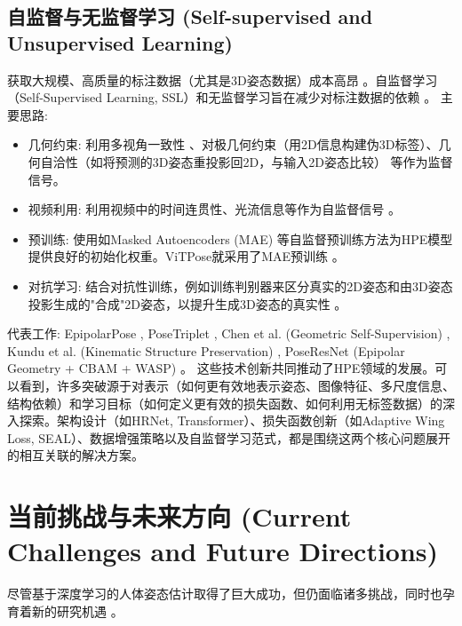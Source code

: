 \documentclass[12pt,a4paper]{article}
\begin{document}
\subsection{自监督与无监督学习 (Self-supervised and Unsupervised Learning)}
获取大规模、高质量的标注数据（尤其是3D姿态数据）成本高昂 \cite{Zhang2018PoseResNet}。自监督学习（Self-Supervised Learning, SSL）和无监督学习旨在减少对标注数据的依赖 \cite{Zhang2018PoseResNet}。
主要思路:
\begin{itemize}
    \item 几何约束: 利用多视角一致性 \cite{Kocabas2019EpipolarPose}、对极几何约束（用2D信息构建伪3D标签）\cite{Zhang2018PoseResNet}、几何自洽性（如将预测的3D姿态重投影回2D，与输入2D姿态比较）\cite{Chen2019Unsupervised3D} 等作为监督信号。 %
    \item 视频利用: 利用视频中的时间连贯性、光流信息等作为自监督信号 \cite{Gong2022PoseTriplet}。 %
    \item 预训练: 使用如Masked Autoencoders (MAE) \cite{He2022MAE} 等自监督预训练方法为HPE模型提供良好的初始化权重。ViTPose就采用了MAE预训练 \cite{He2022MAE}。
    \item 对抗学习: 结合对抗性训练，例如训练判别器来区分真实的2D姿态和由3D姿态投影生成的"合成"2D姿态，以提升生成3D姿态的真实性 \cite{Chen2019Unsupervised3D}。
\end{itemize}
代表工作: EpipolarPose \cite{Kocabas2019EpipolarPose}, PoseTriplet \cite{Gong2022PoseTriplet}, Chen et al. (Geometric Self-Supervision) \cite{Chen2019Unsupervised3D}, Kundu et al. (Kinematic Structure Preservation) \cite{Kundu2020Kinematic}, PoseResNet (Epipolar Geometry + CBAM + WASP) \cite{Zhang2018PoseResNet}。 %
这些技术创新共同推动了HPE领域的发展。可以看到，许多突破源于对表示（如何更有效地表示姿态、图像特征、多尺度信息、结构依赖）和学习目标（如何定义更有效的损失函数、如何利用无标签数据）的深入探索。架构设计（如HRNet, Transformer）、损失函数创新（如Adaptive Wing Loss, SEAL）、数据增强策略以及自监督学习范式，都是围绕这两个核心问题展开的相互关联的解决方案。

\section{当前挑战与未来方向 (Current Challenges and Future Directions)}
尽管基于深度学习的人体姿态估计取得了巨大成功，但仍面临诸多挑战，同时也孕育着新的研究机遇 \cite{Wang2023TransformerSurvey}。
\end{document}
